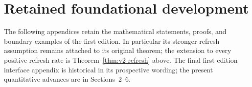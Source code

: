 \section*{Retained foundational development}
The following appendices retain the mathematical statements, proofs, and
boundary examples of the first edition. In particular its stronger
refresh assumption remains attached to its original theorem; the extension
to every positive refresh rate is Theorem~\ref{thm:v2-refresh} above.
The final first-edition interface appendix is historical in its prospective
wording; the present quantitative advances are in Sections~2--6.















